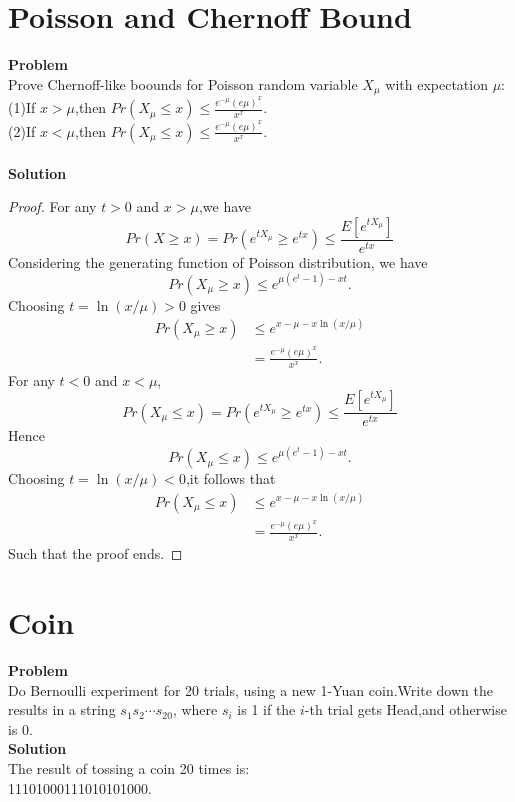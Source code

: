 	\section{Poisson and Chernoff Bound}
	\textbf{Problem}\\
	Prove Chernoff-like boounds for Poisson random variable $X_\mu$ with expectation $\mu$:\\
	(1)If $x>\mu$,then $Pr(X_\mu \leq x) \leq \frac{e^{-\mu}(e\mu)^x}{x^x}.$\\
	(2)If $x<\mu$,then $Pr(X_\mu \leq x) \leq \frac{e^{-\mu}(e\mu)^x}{x^x}.$\\\\
	\textbf{Solution}\\
	\begin{proof}
		For any $t > 0$ and $x > \mu$,we have
	\begin{equation*}
		Pr(X \ge x)=Pr(e^{tX_\mu} \ge e^{tx}) \leq \frac{E[e^{tX_\mu}]}{e^{tx}}
	\end{equation*}
	Considering the generating function of Poisson distribution, we have
	\begin{equation*}
		Pr(X_\mu \ge x) \leq e^{\mu(e^t-1)-xt}.
	\end{equation*}
	Choosing $t=\ln(x/\mu) > 0$ gives
	\begin{equation*}
		\begin{split}
			Pr(X_\mu \ge x) 
			& \leq e^{x-\mu-x\ln(x/\mu)}\\
			& = \frac{e^{-\mu}(e\mu)^x}{x^x}.
		\end{split}
	\end{equation*}
	For any $t < 0$ and $x < \mu$,
	\begin{equation*}
		Pr(X_\mu \leq x)=Pr(e^{tX_\mu} \ge e^{tx}) \leq \frac{E[e^{tX_\mu}]}{e^{tx}}
	\end{equation*}
	Hence
	\begin{equation*}
		Pr(X_\mu \leq x) \leq e^{\mu(e^t-1)-xt}.
	\end{equation*}
	Choosing $t=\ln(x/\mu) < 0$,it follows that
	\begin{equation*}
		\begin{split}
			Pr(X_\mu \leq x) 
			& \leq e^{x-\mu-x\ln(x/\mu)}\\
			& = \frac{e^{-\mu}(e\mu)^x}{x^x}.
		\end{split}
	\end{equation*}
	Such that the proof ends.
	\end{proof}
	
	\section{Coin}
		\textbf{Problem}\\
		Do Bernoulli experiment for 20 trials, using a new 1-Yuan coin.Write down the results in a string $s_1 s_2 \cdots s_{20}$, where $s_i$ is 1 if the $i$-th trial gets Head,and otherwise is 0.
		\\
		\textbf{Solution}\\
		The result of tossing a coin 20 times is:\\11101000111010101000.
	
